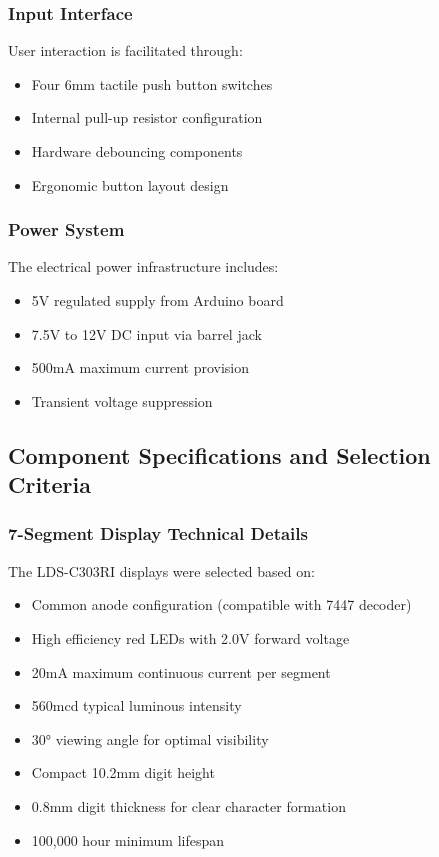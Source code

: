 \documentclass[a4paper,12pt]{article}
\begin{document}
\subsubsection{Input Interface}
User interaction is facilitated through:
\begin{itemize}
    \item Four 6mm tactile push button switches
    \item Internal pull-up resistor configuration
    \item Hardware debouncing components
    \item Ergonomic button layout design
\end{itemize}

\subsubsection{Power System}
The electrical power infrastructure includes:
\begin{itemize}
    \item 5V regulated supply from Arduino board
    \item 7.5V to 12V DC input via barrel jack
    \item 500mA maximum current provision
    \item Transient voltage suppression
\end{itemize}

\subsection{Component Specifications and Selection Criteria}

\subsubsection{7-Segment Display Technical Details}
The LDS-C303RI displays were selected based on:
\begin{itemize}
    \item Common anode configuration (compatible with 7447 decoder)
    \item High efficiency red LEDs with 2.0V forward voltage
    \item 20mA maximum continuous current per segment
    \item 560mcd typical luminous intensity
    \item 30° viewing angle for optimal visibility
    \item Compact 10.2mm digit height
    \item 0.8mm digit thickness for clear character formation
    \item 100,000 hour minimum lifespan
\end{itemize}
\end{document}
